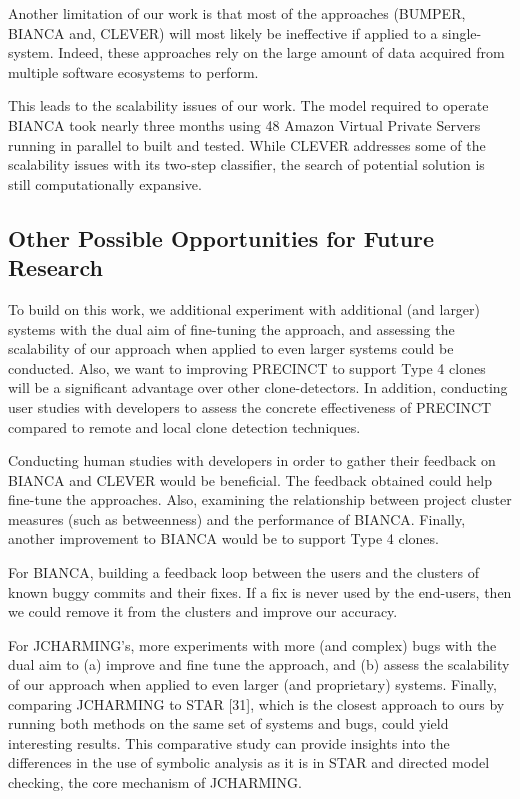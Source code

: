 \documentclass[12pt]{report}
\begin{document}
Another limitation of our work is that most of the approaches (BUMPER,
BIANCA and, CLEVER) will most likely be ineffective if applied to a
single-system. Indeed, these approaches rely on the large amount of data
acquired from multiple software ecosystems to perform.

This leads to the scalability issues of our work. The model required to
operate BIANCA took nearly three months using 48 Amazon Virtual Private
Servers running in parallel to built and tested. While CLEVER addresses
some of the scalability issues with its two-step classifier, the search
of potential solution is still computationally expansive.

\subsection{Other Possible Opportunities for Future
Research}\label{other-possible-opportunities-for-future-research}

To build on this work, we additional experiment with additional (and
larger) systems with the dual aim of fine-tuning the approach, and
assessing the scalability of our approach when applied to even larger
systems could be conducted. Also, we want to improving PRECINCT to
support Type 4 clones will be a significant advantage over other
clone-detectors. In addition, conducting user studies with developers to
assess the concrete effectiveness of PRECINCT compared to remote and
local clone detection techniques.

Conducting human studies with developers in order to gather their
feedback on BIANCA and CLEVER would be beneficial. The feedback obtained
could help fine-tune the approaches. Also, examining the relationship
between project cluster measures (such as betweenness) and the
performance of BIANCA. Finally, another improvement to BIANCA would be
to support Type 4 clones.

For BIANCA, building a feedback loop between the users and the clusters
of known buggy commits and their fixes. If a fix is never used by the
end-users, then we could remove it from the clusters and improve our
accuracy.

For JCHARMING's, more experiments with more (and complex) bugs with the
dual aim to (a) improve and fine tune the approach, and (b) assess the
scalability of our approach when applied to even larger (and
proprietary) systems. Finally, comparing JCHARMING to STAR {[}31{]},
which is the closest approach to ours by running both methods on the
same set of systems and bugs, could yield interesting results. This
comparative study can provide insights into the differences in the use
of symbolic analysis as it is in STAR and directed model checking, the
core mechanism of JCHARMING.
\end{document}
